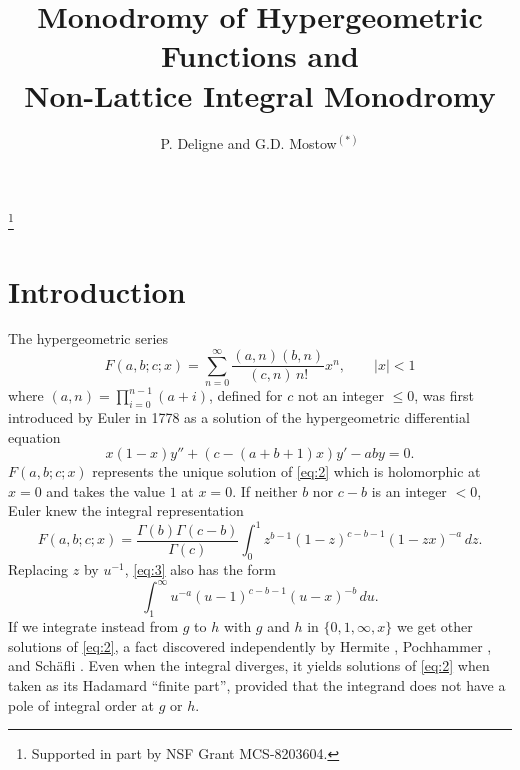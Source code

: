 \documentclass[12pt,a4paper]{article}
\theoremstyle{plain}
\theoremstyle{definition}
\theoremstyle{remark}
\numberwithin{equation}{section}
\begin{document}
\title{Monodromy of Hypergeometric Functions and\\Non-Lattice Integral Monodromy}
\author{P. Deligne and G.D. Mostow${}^{(*)}$}
\thanks{Supported in part by NSF Grant MCS-8203604.}
\date{}
\maketitle

\section*{Introduction}

The hypergeometric series
\begin{equation}\label{eq:1}
F(a,b;c;x) = \sum_{n=0}^{\infty} \frac{(a,n)(b,n)}{(c,n)\, n!} x^n, \qquad |x| < 1
\end{equation}
where $(a,n) = \prod_{i=0}^{n-1} (a+i)$, defined for $c$ not an integer $\leq 0$, was first introduced by Euler in 1778 as a solution of the hypergeometric differential equation
\begin{equation}\label{eq:2}
x(1-x)y'' + (c - (a+b+1)x) y' - aby = 0.
\end{equation}
$F(a,b;c;x)$ represents the unique solution of \eqref{eq:2} which is holomorphic at $x=0$ and takes the value $1$ at $x=0$. If neither $b$ nor $c-b$ is an integer $< 0$, Euler knew the integral representation
\begin{equation}\label{eq:3}
F(a,b;c;x) = \frac{\Gamma(b)\Gamma(c-b)}{\Gamma(c)} \int_0^1 z^{b-1} (1-z)^{c-b-1} (1-zx)^{-a} \, dz.
\end{equation}
Replacing $z$ by $u^{-1}$, \eqref{eq:3} also has the form
\begin{equation*}\tag{$3'$}
\int_1^{\infty} u^{-a} (u-1)^{c-b-1} (u-x)^{-b} \, du.
\end{equation*}
If we integrate instead from $g$ to $h$ with $g$ and $h$ in $\{0, 1, \infty, x\}$ we get other solutions of \eqref{eq:2}, a fact discovered independently by Hermite \cite{Hermite}, Pochhammer \cite{Pochhammer}, and Sch\"afli \cite{Schaefli}. Even when the integral diverges, it yields solutions of \eqref{eq:2} when taken as its Hadamard ``finite part'', provided that the integrand does not have a pole of integral order at $g$ or $h$.
\end{document}
